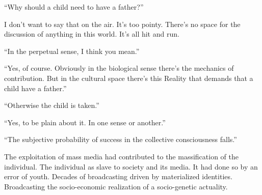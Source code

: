 

﻿``Why should a child need to have a father?''

I don't want to say that on the air.  It's too pointy.  There's no
space for the discussion of anything in this world.  It's all hit and
run.

``In the perpetual sense, I think you mean.''

``Yes, of course.  Obviously in the biological sense there's the
mechanics of contribution.  But in the cultural space there's this
Reality that demands that a child have a father.''

``Otherwise the child is taken.''

``Yes, to be plain about it.  In one sense or another.''

``The subjective probability of success in the collective
consciousness falls.''

The exploitation of mass media had contributed to the massification of
the individual.  The individual as slave to society and its media.  It
had done so by an error of youth.  Decades of broadcasting driven by
materialized identities.  Broadcasting the socio-economic realization
of a socio-genetic actuality.

\bye
